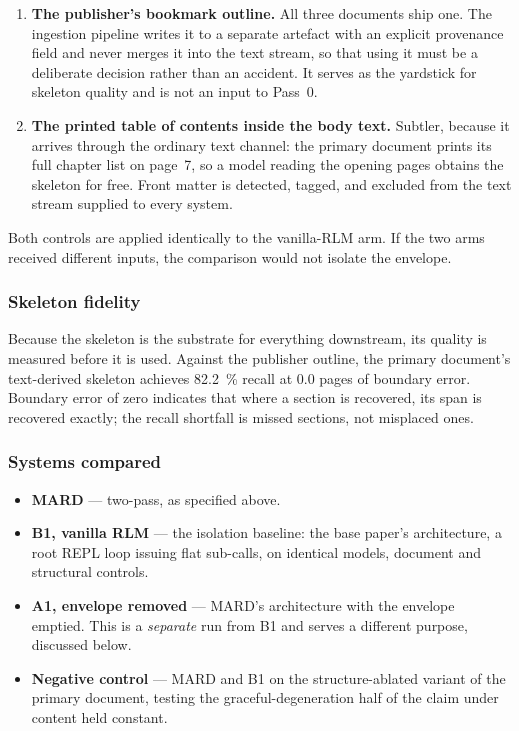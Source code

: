 \documentclass[conference]{IEEEtran}
\begin{document}
\begin{enumerate}
  \item \textbf{The publisher's bookmark outline.} All three documents ship
  one. The ingestion pipeline writes it to a separate artefact with an
  explicit provenance field and never merges it into the text stream, so that
  using it must be a deliberate decision rather than an accident. It serves as
  the yardstick for skeleton quality and is not an input to Pass~0.
  \item \textbf{The printed table of contents inside the body text.} Subtler,
  because it arrives through the ordinary text channel: the primary document
  prints its full chapter list on page~7, so a model reading the opening pages
  obtains the skeleton for free. Front matter is detected, tagged, and
  excluded from the text stream supplied to every system.
\end{enumerate}

Both controls are applied identically to the vanilla-RLM arm. If the two arms
received different inputs, the comparison would not isolate the envelope.

\subsubsection{Skeleton fidelity}
Because the skeleton is the substrate for everything downstream, its quality
is measured before it is used. Against the publisher outline, the primary
document's text-derived skeleton achieves \SI{82.2}{\percent} recall at
\num{0.0} pages of boundary error. Boundary error of zero indicates that
where a section is recovered, its span is recovered exactly; the recall
shortfall is missed sections, not misplaced ones.

\subsubsection{Systems compared}
\begin{itemize}
  \item \textbf{MARD} --- two-pass, as specified above.
  \item \textbf{B1, vanilla RLM} --- the isolation baseline: the base paper's
  architecture, a root REPL loop issuing flat sub-calls, on identical models,
  document and structural controls.
  \item \textbf{A1, envelope removed} --- MARD's architecture with the
  envelope emptied. This is a \emph{separate} run from B1 and serves a
  different purpose, discussed below.
  \item \textbf{Negative control} --- MARD and B1 on the structure-ablated
  variant of the primary document, testing the graceful-degeneration half of
  the claim under content held constant.
\end{itemize}
\end{document}
